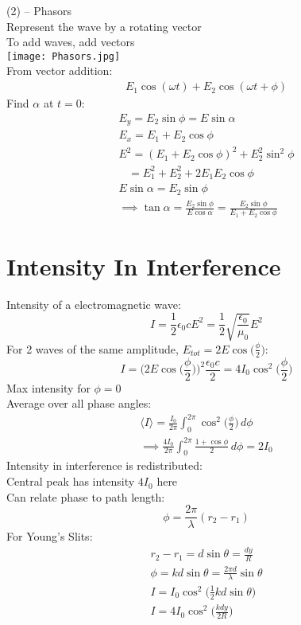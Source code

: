 \documentclass[a4paper, 11pt, fleqn, normalem]{report}
\begin{document}
(2) -- Phasors \\
Represent the wave by a rotating vector \\
To add waves, add vectors \\
\texttt{[image: Phasors.jpg]}\\
From vector addition:
\begin{gather*}
    E_{1}\cos{(\omega t)} + E_{2}\cos{(\omega t + \phi)}
\end{gather*}
Find $\alpha$ at $t = 0$:
\begin{gather*}
    E_{y} = E_{2}\sin{\phi} = E\sin{\alpha} \\
    E_{x} = E_{1} + E_{2}\cos{\phi} \\
    E^{2} = (E_{1} + E_{2}\cos{\phi})^{2} + E_{2}^{2}\sin^{2}{\phi} \\
    ~~~\, = E_{1}^{2} + E_{2}^{2} + 2E_{1}E_{2}\cos{\phi} \\
    E\sin{\alpha} = E_{2}\sin{\phi} \\
    \implies \tan{\alpha} = \frac{E_{2}\sin{\phi}}{E\cos{\alpha}} = \frac{E_{2}\sin{\phi}}{E_{1} + E_{2}\cos{\phi}}
\end{gather*}

\section{Intensity In Interference}
Intensity of a electromagnetic wave:
\begin{equation*}
    I = \frac{1}{2}\epsilon_{0}cE^{2} = \frac{1}{2}\sqrt{\frac{\epsilon_{0}}{\mu_{0}}}E^{2}
\end{equation*}
For 2 waves of the same amplitude, $E_{tot} = 2E\cos{\Big(\frac{\phi}{2}\Big)}$:
\begin{equation*}
    I = \Big(2E\cos{\Big(\frac{\phi}{2}\Big)}\Big)^{2} \frac{\epsilon_{0}c}{2} = 4I_{0}\cos^{2}{\Big(\frac{\phi}{2}\Big)}
\end{equation*}
Max intensity for $\phi = 0$\\
Average over all phase angles:
\begin{gather*}
    \langle I\rangle = \frac{I_{0}}{2\pi}\int_{0}^{2\pi}\cos^{2}{\Big(\frac{\phi}{2}\Big)}\, d\phi \\
    \implies \frac{4I_{0}}{2\pi}\int_{0}^{2\pi}\frac{1 + \cos{\phi}}{2}\, d\phi = 2I_{0}
\end{gather*}
Intensity in interference is redistributed: \\
Central peak has intensity $4I_{0}$ here \\
Can relate phase to path length:
\begin{equation*}
    \phi = \frac{2\pi}{\lambda}(r_{2} - r_{1})
\end{equation*}
For Young's Slits:
\begin{gather*}
    r_{2} - r_{1} = d\sin{\theta} = \frac{dy}{R} \\
    \phi = kd\sin{\theta} = \frac{2\pi d}{\lambda}\sin{\theta} \\
    I = I_{0}\cos^{2}{\Big(\frac{1}{2}kd\sin{\theta}\Big)} \\
    I = 4I_{0}\cos^{2}{\Big(\frac{kdy}{2R}\Big)}
\end{gather*}
\end{document}
